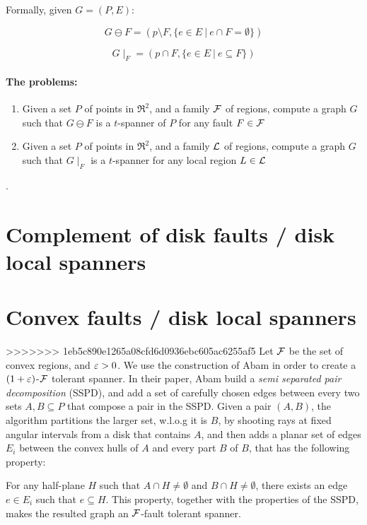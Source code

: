 \documentclass[12pt]{article}%
\begin{document}
Formally, given $G=(P,E)$:
	
$$G\ominus F = (p\setminus F, \{e\in E~|~ e\cap F = \emptyset\})$$

$$G\mid_F = (p \cap F, \{e\in E~|~ e\subseteq F\})$$
	
\paragraph{The problems:}

\begin{enumerate}
    \item Given a set $P$ of points in $\Re^2$, and a family $\mathcal{F}$ of
    regions, compute a graph $G$ such that $G\ominus F$ is a
    $t$-spanner of $P$ for any fault $F\in\mathcal{F}$
    \item Given a set $P$ of points in $\Re^2$, and a family $\mathcal{L}$ of
    regions, compute a graph $G$ such that $G\mid_F$ is a $t$-spanner
    for any local region $L\in\mathcal{L}$
\end{enumerate}
.

	
\section{Complement of disk faults / disk local spanners}
	
	
\section{Convex faults / disk local spanners}
>>>>>>> 1eb5c890e1265a08cfd6d0936ebc605ac6255af5
Let $\mathcal{F}$ be the set of convex regions, and $\varepsilon>0$. We use the
construction of Abam \etal \cite{abfg-rftgs-09} in order to create a
$(1+\varepsilon)$-$\mathcal{F}$ tolerant spanner. In their paper, Abam \etal build a
\emph{semi separated pair decomposition} (SSPD), and add a set of
carefully chosen edges between every two sets $A,B\subseteq P$ that
compose a pair in the SSPD. Given a pair $(A,B)$, the algorithm
partitions the larger set, w.l.o.g it is $B$, by shooting rays at
fixed angular intervals from a disk that contains $A$, and then adds a
planar set of edges $E_i$ between the convex hulls of $A$ and every
part $B$ of $B$, that has the following property:

For any half-plane $H$ such that $A\cap H\neq \emptyset$ and
$B\cap H\neq \emptyset$, there exists an edge $e\in E_i$ such that
$e\subseteq H$. This property, together with the properties of the
SSPD, makes the resulted graph an $\mathcal{F}$-fault tolerant spanner.
\end{document}
